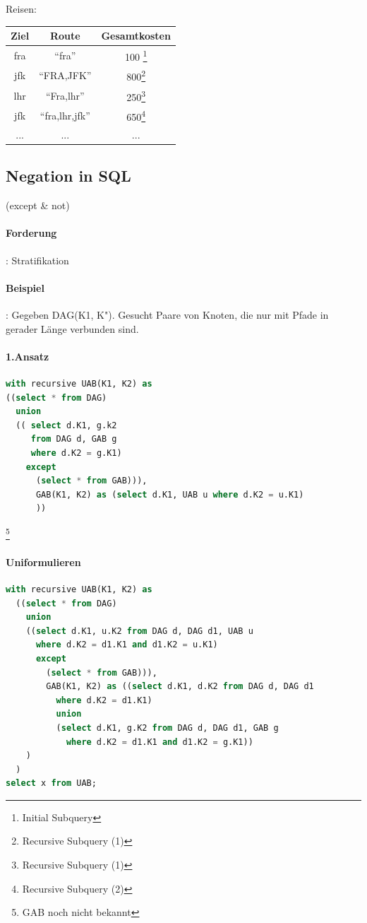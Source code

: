 \documentclass[12pt, a4paper]{article}
\begin{document}
Reisen: \\
\begin{tabular}{|c|c|c|}
\hline
Ziel & Route & Gesamtkosten \\ \hline
fra & ``fra'' & 100 \footnote{Initial Subquery} \\
\hdashline
jfk & ``FRA,JFK'' & 800\footnote{Recursive Subquery (1)} \\
lhr & ``Fra,lhr'' & 250\footnote{Recursive Subquery (1)} \\
\hdashline
jfk & ``fra,lhr,jfk'' & 650\footnote{Recursive Subquery (2)} \\
... & ... & ...  \\
\hline
\end{tabular}

\subsection*{Negation in SQL}
(except \& not) \\

\paragraph{Forderung}: Stratifikation
\paragraph{Beispiel}: Gegeben DAG(K1, K"). Gesucht Paare von Knoten, die nur mit Pfade in gerader Länge verbunden sind.
\paragraph{1.Ansatz}
\begin{lstlisting}[language=SQL]
with recursive UAB(K1, K2) as 
((select * from DAG)
  union 
  (( select d.K1, g.k2
     from DAG d, GAB g 
     where d.K2 = g.K1)
    except
      (select * from GAB))),
      GAB(K1, K2) as (select d.K1, UAB u where d.K2 = u.K1) 
      ))
\end{lstlisting}
\footnote{GAB noch nicht bekannt}

\paragraph{Uniformulieren}

\begin{lstlisting}[language=SQL]
with recursive UAB(K1, K2) as
  ((select * from DAG)
    union 
    ((select d.K1, u.K2 from DAG d, DAG d1, UAB u
      where d.K2 = d1.K1 and d1.K2 = u.K1)
      except
        (select * from GAB))),
        GAB(K1, K2) as ((select d.K1, d.K2 from DAG d, DAG d1 
          where d.K2 = d1.K1)
          union
          (select d.K1, g.K2 from DAG d, DAG d1, GAB g
            where d.K2 = d1.K1 and d1.K2 = g.K1))
    )
  )
select x from UAB;
\end{lstlisting}
\end{document}
